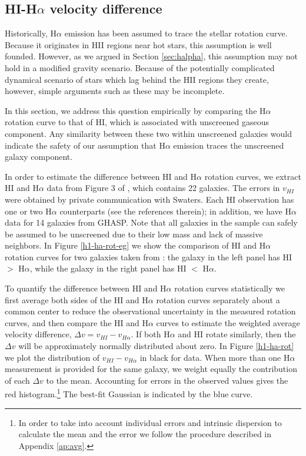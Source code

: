 \documentclass[twocolappendix, numberedappendix]{emulateapj}
\newcommand{\ha}{H$\alpha$}
\begin{document}
\subsection{HI-\ha{} velocity difference}
\label{sec:hihalpha}

Historically, \ha{} emission has been assumed to trace the stellar rotation
curve.  Because it originates in HII regions near hot stars, this assumption
is well founded.  However, as we argued in Section \ref{sec:halpha}, this
assumption may not hold in a modified gravity scenario.  Because of the
potentially complicated dynamical scenario of stars which lag behind the HII
regions they create, however, simple arguments such as these may be incomplete.

In this section, we address this question empirically
by comparing the \ha{} rotation curve to that of HI, which is
associated with unscreened gaseous component. Any similarity between
these two within unscreened galaxies would indicate the safety of our
assumption that \ha{} emission traces the unscreened galaxy component.

In order to estimate the difference between HI and \ha{} rotation
curves, we extract HI and \ha{} data from Figure 3 of \citet{Swaters2009}, which
contains 22 galaxies. The errors in $v_{HI}$ were obtained by private
communication with Swaters.  Each HI observation has one or two \ha{}
counterparts (see the references therein); in addition, we have \ha{} data for
14 galaxies from GHASP. Note that all galaxies in the sample can safely be
assumed to be unscreened due
to their low mass and lack of massive neighbors. In Figure \ref{h1-ha-rot-eg} we
show the comparison of HI and \ha{} rotation curves for two galaxies taken from
\citet{Swaters2009}: the galaxy in the left panel has HI $>$ \ha{}, while the
galaxy in the right panel has HI $<$ \ha{}.


To quantify the difference between HI and \ha{} rotation curves statistically
we first average both sides of the HI and \ha{} rotation curves
separately about a common center to reduce the observational uncertainty in the
measured rotation curves, and then compare the HI and \ha{} curves to estimate
the weighted average velocity difference, $\Delta v = v_{HI} - v_{H\alpha}$.
If both \ha{} and HI rotate similarly, then the $\Delta v$ will
be approximately normally distributed about zero.
In Figure \ref{h1-ha-rot} we plot the distribution of $v_{HI}-v_{H\alpha}$ in
black for \citet{Swaters2009} data. When more than one
\ha{} measurement is provided for the same galaxy, we weight equally the
contribution of each  $\Delta v$ to the mean. Accounting for errors in the
observed values gives the red histogram.\footnote{
In order to take into account individual errors and
intrinsic dispersion to calculate the mean and the error we follow the
procedure described in Appendix \ref{ap:avg}.}  The best-fit Gaussian is
indicated by the blue curve.
\end{document}
